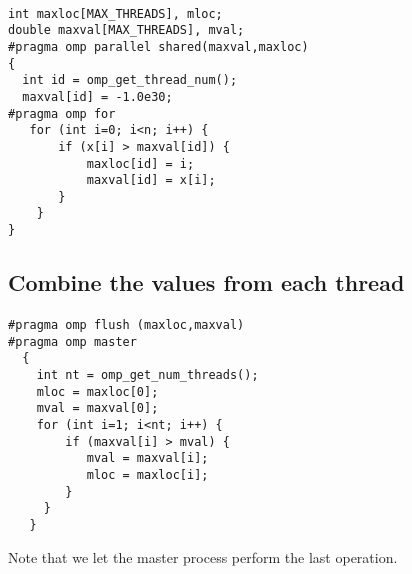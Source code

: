 \paragraph{}















\begin{verbatim}
int maxloc[MAX_THREADS], mloc;
double maxval[MAX_THREADS], mval; 
#pragma omp parallel shared(maxval,maxloc)
{
  int id = omp_get_thread_num(); 
  maxval[id] = -1.0e30;
#pragma omp for
   for (int i=0; i<n; i++) {
       if (x[i] > maxval[id]) { 
           maxloc[id] = i;
           maxval[id] = x[i]; 
       }
    }
}

\end{verbatim}



\subsection*{Combine the values from each thread}

\paragraph{}














\begin{verbatim}
#pragma omp flush (maxloc,maxval)
#pragma omp master
  {
    int nt = omp_get_num_threads(); 
    mloc = maxloc[0]; 
    mval = maxval[0]; 
    for (int i=1; i<nt; i++) {
        if (maxval[i] > mval) { 
           mval = maxval[i]; 
           mloc = maxloc[i];
        } 
     }
   }

\end{verbatim}

Note that we let the master process perform the last operation.



